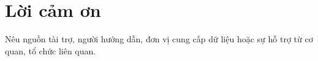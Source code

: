 \section*{Lời cảm ơn}
Nêu nguồn tài trợ, người hướng dẫn, đơn vị cung cấp dữ liệu hoặc sự hỗ trợ từ
cơ quan, tổ chức liên quan.
